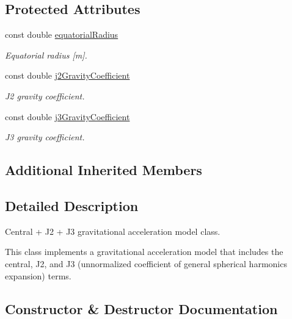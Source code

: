 \subsection*{Protected Attributes}
\begin{DoxyCompactItemize}
\item 
const double \hyperlink{classtudat_1_1gravitation_1_1CentralJ2J3GravitationalAccelerationModel_a49cfbe489574fea31f7b233eef413dc3}{equatorial\+Radius}
\begin{DoxyCompactList}\small\item\em Equatorial radius \mbox{[}m\mbox{]}. \end{DoxyCompactList}\item 
const double \hyperlink{classtudat_1_1gravitation_1_1CentralJ2J3GravitationalAccelerationModel_a7d36540461ca5f8dfead0cee415452b3}{j2\+Gravity\+Coefficient}
\begin{DoxyCompactList}\small\item\em J2 gravity coefficient. \end{DoxyCompactList}\item 
const double \hyperlink{classtudat_1_1gravitation_1_1CentralJ2J3GravitationalAccelerationModel_a5b382c2c9adea0e0f46e46bb44f242f2}{j3\+Gravity\+Coefficient}
\begin{DoxyCompactList}\small\item\em J3 gravity coefficient. \end{DoxyCompactList}\end{DoxyCompactItemize}
\subsection*{Additional Inherited Members}


\subsection{Detailed Description}
Central + J2 + J3 gravitational acceleration model class. 

This class implements a gravitational acceleration model that includes the central, J2, and J3 (unnormalized coefficient of general spherical harmonics expansion) terms. 

\subsection{Constructor \& Destructor Documentation}
